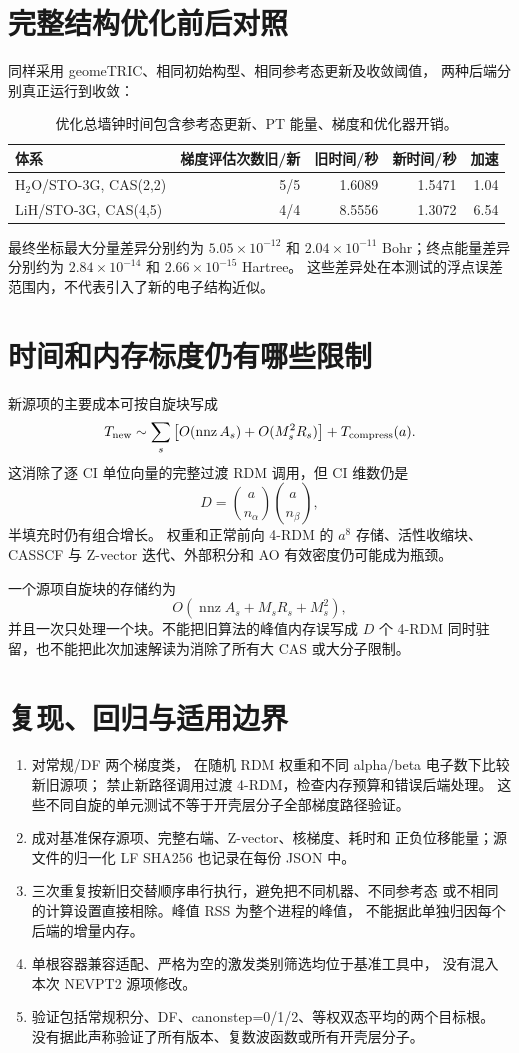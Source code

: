 \documentclass[UTF8,a4paper,11pt,fontset=fandol]{ctexart}
\begin{document}
\section{完整结构优化前后对照}
同样采用 geomeTRIC、相同初始构型、相同参考态更新及收敛阈值，
两种后端分别真正运行到收敛：
\begin{table}[htbp]\centering\small
\caption{优化总墙钟时间包含参考态更新、PT 能量、梯度和优化器开销。}
\begin{tabular}{lrrrr}\toprule
体系 & 梯度评估次数旧/新 & 旧时间/秒 & 新时间/秒 & 加速\\\midrule
H$_2$O/STO-3G, CAS(2,2) & 5/5 & 1.6089 & 1.5471 & 1.04 \\
LiH/STO-3G, CAS(4,5) & 4/4 & 8.5556 & 1.3072 & 6.54 \\
\bottomrule\end{tabular}
\end{table}
最终坐标最大分量差异分别约为 $5.05\times10^{-12}$ 和
$2.04\times10^{-11}$ Bohr；终点能量差异分别约为
$2.84\times10^{-14}$ 和 $2.66\times10^{-15}$ Hartree。
这些差异处在本测试的浮点误差范围内，不代表引入了新的电子结构近似。

\section{时间和内存标度仍有哪些限制}
新源项的主要成本可按自旋块写成
\[
 T_{\rm new}\sim
 \sum_s\left[
 O(\operatorname{nnz} A_s)+O(M_s^2R_s)
 \right]+T_{\rm compress}(a).
\]
这消除了逐 CI 单位向量的完整过渡 RDM 调用，但 CI 维数仍是
\[
 D=\binom{a}{n_\alpha}\binom{a}{n_\beta},
\]
半填充时仍有组合增长。
权重和正常前向 4-RDM 的 $a^8$ 存储、活性收缩块、
CASSCF 与 Z-vector 迭代、外部积分和 AO 有效密度仍可能成为瓶颈。

一个源项自旋块的存储约为
\[
 O(\operatorname{nnz}A_s+M_sR_s+M_s^2),
\]
并且一次只处理一个块。不能把旧算法的峰值内存误写成 $D$ 个 4-RDM
同时驻留，也不能把此次加速解读为消除了所有大 CAS 或大分子限制。

\section{复现、回归与适用边界}
\begin{enumerate}
 \item {} 对常规/DF 两个梯度类，
 在随机 RDM 权重和不同 alpha/beta 电子数下比较新旧源项；
 禁止新路径调用过渡 4-RDM，检查内存预算和错误后端处理。
 这些不同自旋的单元测试不等于开壳层分子全部梯度路径验证。
 \item 成对基准保存源项、完整右端、Z-vector、核梯度、耗时和
 正负位移能量；源文件的归一化 LF SHA256 也记录在每份 JSON 中。
 \item 三次重复按新旧交替顺序串行执行，避免把不同机器、不同参考态
 或不相同的计算设置直接相除。峰值 RSS 为整个进程的峰值，
 不能据此单独归因每个后端的增量内存。
 \item 单根容器兼容适配、严格为空的激发类别筛选均位于基准工具中，
 没有混入本次 NEVPT2 源项修改。
 \item 验证包括常规积分、DF、canonstep=0/1/2、等权双态平均的两个目标根。
 没有据此声称验证了所有版本、复数波函数或所有开壳层分子。
\end{enumerate}
\end{document}
